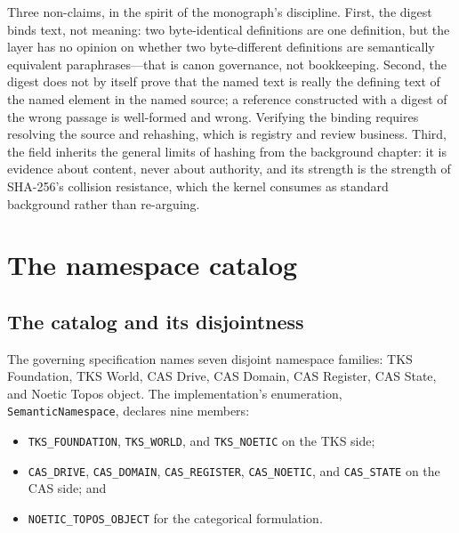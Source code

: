 Three non-claims, in the spirit of the monograph's discipline.
First, the digest binds text, not meaning: two byte-identical
definitions are one definition, but the layer has no opinion on
whether two byte-different definitions are semantically equivalent
paraphrases---that is canon governance, not bookkeeping. Second,
the digest does not by itself prove that the named text is really
the defining text of the named element in the named source; a
reference constructed with a digest of the wrong passage is
well-formed and wrong. Verifying the binding requires resolving the
source and rehashing, which is registry and review business.
Third, the field inherits the general limits of hashing from the
background chapter: it is evidence about content, never about
authority, and its strength is the strength of SHA-256's collision
resistance, which the kernel consumes as standard background
rather than re-arguing.

\section{The namespace catalog}\label{ch03:namespaces}

\subsection{The catalog and its disjointness}\label{ch03:catalog}

The governing specification names seven disjoint namespace
families: TKS Foundation, TKS World, CAS Drive, CAS Domain, CAS
Register, CAS State, and Noetic Topos object. The implementation's
enumeration, \texttt{SemanticNamespace}, declares nine members:

\begin{itemize}
\item \texttt{TKS\_FOUNDATION}, \texttt{TKS\_WORLD}, and
\texttt{TKS\_NOETIC} on the TKS side;
\item \texttt{CAS\_DRIVE}, \texttt{CAS\_DOMAIN},
\texttt{CAS\_REGISTER}, \texttt{CAS\_NOETIC}, and
\texttt{CAS\_STATE} on the CAS side; and
\item \texttt{NOETIC\_TOPOS\_OBJECT} for the categorical
formulation.
\end{itemize}

